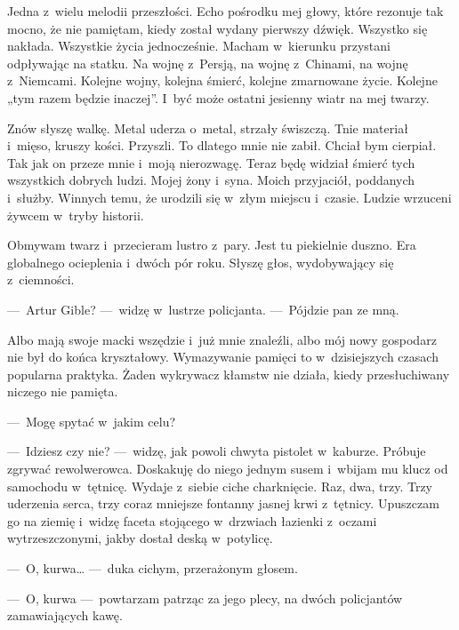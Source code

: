 Jedna z~wielu melodii przeszłości. Echo pośrodku mej głowy, które rezonuje tak mocno, że nie pamiętam, kiedy został wydany pierwszy dźwięk. Wszystko się nakłada. Wszystkie życia jednocześnie. Macham w~kierunku przystani odpływając na statku. Na wojnę z~Persją, na wojnę z~Chinami, na wojnę z~Niemcami. Kolejne wojny, kolejna śmierć, kolejne zmarnowane życie. Kolejne „tym razem będzie inaczej”. I~być może ostatni jesienny wiatr na mej twarzy.

Znów słyszę walkę. Metal uderza o~metal, strzały świszczą. Tnie materiał i~mięso, kruszy kości. Przyszli. To dlatego mnie nie zabił. Chciał bym cierpiał. Tak jak on przeze mnie i~moją nierozwagę. Teraz będę widział śmierć tych wszystkich dobrych ludzi. Mojej żony i~syna. Moich przyjaciół, poddanych i~służby. Winnych temu, że urodzili się w~złym miejscu i~czasie. Ludzie wrzuceni żywcem w~tryby historii.

\paraSep

Obmywam twarz i~przecieram lustro z~pary. Jest tu piekielnie duszno. Era globalnego ocieplenia i~dwóch pór roku. Słyszę głos, wydobywający się z~ciemności.

---~Artur Gible? ---~widzę w~lustrze policjanta. ---~Pójdzie pan ze mną.

Albo mają swoje macki wszędzie i~już mnie znaleźli, albo mój nowy gospodarz nie był do końca kryształowy. Wymazywanie pamięci to w~dzisiejszych czasach popularna praktyka. Żaden wykrywacz kłamstw nie działa, kiedy przesłuchiwany niczego nie pamięta.

---~Mogę spytać w~jakim celu?

---~Idziesz czy nie? ---~widzę, jak powoli chwyta pistolet w~kaburze. Próbuje zgrywać rewolwerowca. Doskakuję do niego jednym susem i~wbijam mu klucz od samochodu w~tętnicę. Wydaje z~siebie ciche charknięcie. Raz, dwa, trzy. Trzy uderzenia serca, trzy coraz mniejsze fontanny jasnej krwi z~tętnicy. Upuszczam go na ziemię i~widzę faceta stojącego w~drzwiach łazienki z~oczami wytrzeszczonymi, jakby dostał deską w~potylicę.

---~O, kurwa… ---~duka cichym, przerażonym głosem.

---~O, kurwa ---~powtarzam patrząc za jego plecy, na dwóch policjantów zamawiających kawę.
